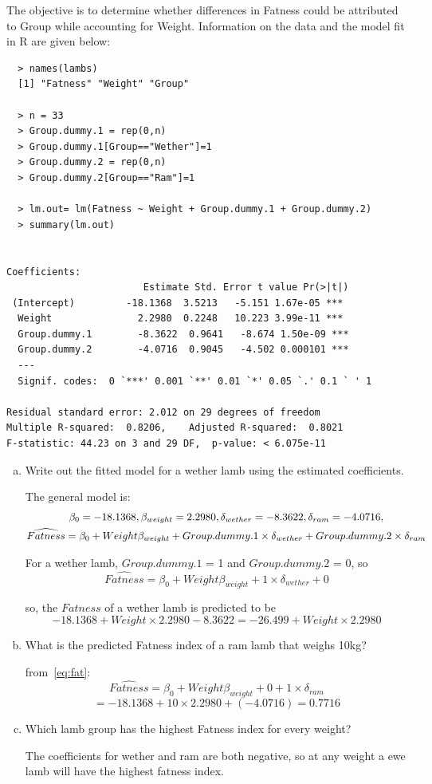 \documentclass[12pt,letterpaper]{article}
\begin{document}
The objective is to determine whether differences in Fatness could be attributed to Group
while accounting for Weight. Information on the data and the model fit in R are given below:
\begin{verbatim}
  > names(lambs)
  [1] "Fatness" "Weight" "Group"
  
  > n = 33
  > Group.dummy.1 = rep(0,n)
  > Group.dummy.1[Group=="Wether"]=1
  > Group.dummy.2 = rep(0,n)
  > Group.dummy.2[Group=="Ram"]=1
  
  > lm.out= lm(Fatness ~ Weight + Group.dummy.1 + Group.dummy.2)
  > summary(lm.out)
  

Coefficients:
                        Estimate Std. Error t value Pr(>|t|)    
 (Intercept)         -18.1368  3.5213   -5.151 1.67e-05 ***
  Weight               2.2980  0.2248   10.223 3.99e-11 ***
  Group.dummy.1        -8.3622  0.9641   -8.674 1.50e-09 ***
  Group.dummy.2        -4.0716  0.9045   -4.502 0.000101 ***
  ---
  Signif. codes:  0 `***' 0.001 `**' 0.01 `*' 0.05 `.' 0.1 ` ' 1

Residual standard error: 2.012 on 29 degrees of freedom
Multiple R-squared:  0.8206,	Adjusted R-squared:  0.8021 
F-statistic: 44.23 on 3 and 29 DF,  p-value: < 6.075e-11

\end{verbatim} 

\begin{enumerate}[a)]
  \item Write out the fitted model for a wether lamb using the estimated coefficients.
  
  The general model is:
  \begin{gather}
    \beta_0 = -18.1368, \beta_{weight} = 2.2980, \delta_{wether} = -8.3622, \delta_{ram} = -4.0716,\notag\\
    \widehat{Fatness} = \beta_0 + Weight\beta_{weight} + Group.dummy.1\times\delta_{wether} + Group.dummy.2\times\delta_{ram} \label{eq:fat}
  \end{gather}

  For a wether lamb, $Group.dummy.1$ = 1 and $Group.dummy.2$ = 0, so  
  \[\widehat{Fatness} = \beta_0 + Weight\beta_{weight} + 1\times\delta_{wether} + 0\]
  
  
  so, the $Fatness$ of a wether lamb is predicted to be 
  \[-18.1368 + Weight\times 2.2980 - 8.3622 = -26.499 +  Weight\times 2.2980\]
  
  \item What is the predicted Fatness index of a ram lamb that weighs 10kg?
  
  from~\eqref{eq:fat}:
   \[\widehat{Fatness} = \beta_0 + Weight\beta_{weight} + 0 + 1\times\delta_{ram} \]
   \[ = -18.1368 + 10\times 2.2980 + (-4.0716) = 0.7716\] 
  
 
  \item Which lamb group has the highest Fatness index for every weight?
  
  The coefficients for wether and ram are both negative, so at any weight a ewe lamb will have the highest fatness index.

\end{enumerate}
\end{document}
